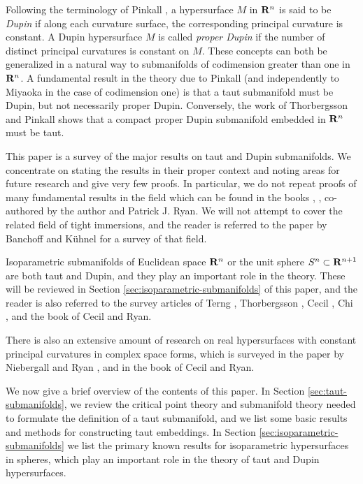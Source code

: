 \documentclass[12pt]{article}
\begin{document}
Following the terminology of Pinkall \cite{P2}, a hypersurface $M$ in  ${\bf R}^n$ is said to be {\em Dupin}
if along each curvature surface, the corresponding principal
curvature is constant.  A Dupin hypersurface $M$
is called {\em proper Dupin}
if the number of distinct principal curvatures is constant on $M$.
These concepts can both be generalized in a natural way to submanifolds
of codimension greater than one in  ${\bf R}^n$.  A fundamental
result in the theory due to Pinkall \cite{P4} (and independently to Miyaoka \cite{Mi8}
in the case of codimension one) is that a taut submanifold
must be Dupin, but not necessarily proper Dupin.  Conversely, the work of
Thorbergsson \cite{Th1} and Pinkall \cite{P4} shows
that a compact proper Dupin submanifold embedded in  ${\bf R}^n$
must be taut. 

This paper is a survey of the major results on taut and Dupin
submanifolds.  We concentrate on stating the results in their
proper context and noting areas for future research and give
very few proofs.  In particular, we do not repeat proofs
of many fundamental results in the field which can be found
in the books \cite{CR7}, \cite{CR8}, co-authored by the author and Patrick J. Ryan.   
We will not attempt to cover the
related field of tight immersions, and the reader is referred to the
paper by Banchoff and K\"{u}hnel  \cite{BK} for a survey of that field.

Isoparametric submanifolds of Euclidean space ${\bf R}^n$ or the unit sphere $S^n \subset {\bf R}^{n+1}$ are both taut and Dupin, and they play an important role in the theory.  These will be reviewed in Section \ref{sec:isoparametric-submanifolds} of this paper, and the reader
is also referred to the survey articles of Terng \cite{Te5},
Thorbergsson \cite{Th6}, Cecil \cite{Cec10}, Chi \cite{Chi-survey}, and the book
 \cite[pp. 85--184]{CR8} of Cecil and Ryan. 

There is also an
extensive amount of research on real hypersurfaces
with constant principal curvatures in complex
space forms, which is
surveyed in  the paper by Niebergall and Ryan \cite{NieR}, and in the book \cite[pp. 343--551]{CR8} of Cecil and Ryan.

We now give a brief overview 
of the contents of this paper.
In Section \ref{sec:taut-submanifolds}, we review the critical point theory and
submanifold theory needed to formulate the definition of
a taut submanifold, and we list some basic results and methods
for constructing taut embeddings.  In Section \ref{sec:isoparametric-submanifolds} we list the primary 
known results for isoparametric hypersurfaces in spheres, which
play an important role in the theory of taut and Dupin hypersurfaces.
\end{document}
